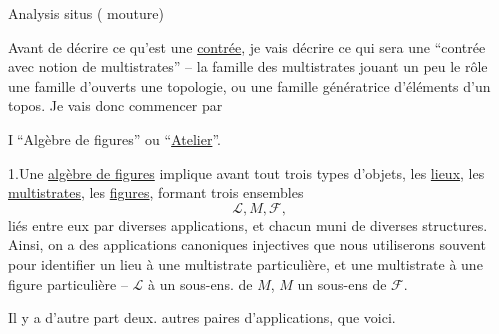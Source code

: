 \begin{center}Analysis situs ( mouture)\end{center}

Avant de décrire ce qu'est une \uline{contrée}, je vais décrire ce qui sera une ``contrée avec notion de multistrates'' -- la famille des multistrates  jouant un peu le rôle  une famille d'ouverts   une topologie, ou une famille génératrice d'éléments d'un topos. Je vais donc commencer par

\textcircled{I}\quad ``Algèbre de figures'' ou ``\uline{Atelier}''.

1.\quad Une \uline{algèbre de figures} implique avant tout trois types d'objets, les \uline{lieux}, les \uline{multistrates}, les \uline{figures}, formant trois ensembles
\begingroup
\makeatletter
\tagsleft@true
\let\veqno\@@leqno
\makeatother
\[
\mathcal{L},M,\mathcal{F},\tag*{(1.1.)}
\]
\endgroup
liés entre eux par diverses applications, et chacun muni de diverses structures. Ainsi, on a des applications canoniques injectives
que nous utiliserons souvent pour identifier un lieu à une multistrate particulière, et une multistrate à une figure particulière -- $\mathcal{L}$ à un sous-ens. de $M$, $M$  un sous-ens de $\mathcal{F}$.

Il y a d'autre part deux. autres paires d'applications, que voici.
